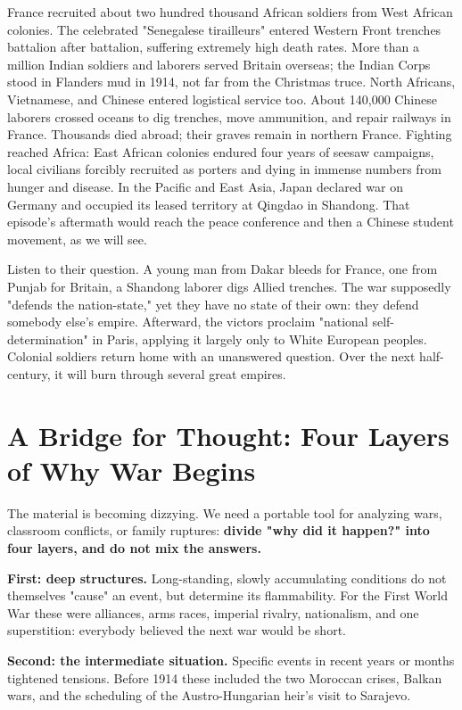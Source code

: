 France recruited about two hundred thousand African soldiers from West African colonies. The celebrated "Senegalese tirailleurs" entered Western Front trenches battalion after battalion, suffering extremely high death rates. More than a million Indian soldiers and laborers served Britain overseas; the Indian Corps stood in Flanders mud in 1914, not far from the Christmas truce. North Africans, Vietnamese, and Chinese entered logistical service too. About 140,000 Chinese laborers crossed oceans to dig trenches, move ammunition, and repair railways in France. Thousands died abroad; their graves remain in northern France. Fighting reached Africa: East African colonies endured four years of seesaw campaigns, local civilians forcibly recruited as porters and dying in immense numbers from hunger and disease. In the Pacific and East Asia, Japan declared war on Germany and occupied its leased territory at Qingdao in Shandong. That episode's aftermath would reach the peace conference and then a Chinese student movement, as we will see.

Listen to their question. A young man from Dakar bleeds for France, one from Punjab for Britain, a Shandong laborer digs Allied trenches. The war supposedly "defends the nation-state," yet they have no state of their own: they defend somebody else's empire. Afterward, the victors proclaim "national self-determination" in Paris, applying it largely only to White European peoples. Colonial soldiers return home with an unanswered question. Over the next half-century, it will burn through several great empires.

\section[Four Layers of Why War Begins]{A Bridge for Thought: Four Layers of Why War Begins}
The material is becoming dizzying. We need a portable tool for analyzing wars, classroom conflicts, or family ruptures: \textbf{divide "why did it happen?" into four layers, and do not mix the answers.}

\textbf{First: deep structures.} Long-standing, slowly accumulating conditions do not themselves "cause" an event, but determine its flammability. For the First World War these were alliances, arms races, imperial rivalry, nationalism, and one superstition: everybody believed the next war would be short.

\textbf{Second: the intermediate situation.} Specific events in recent years or months tightened tensions. Before 1914 these included the two Moroccan crises, Balkan wars, and the scheduling of the Austro-Hungarian heir's visit to Sarajevo.

